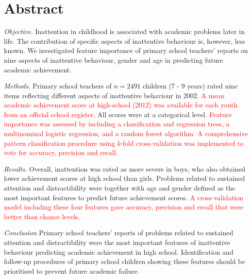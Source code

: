 \documentclass[10pt,letterpaper]{article}
\begin{document}
\section*{Abstract}
\noindent \emph{Objective.}
Inattention in childhood is associated with academic problems later in life. The contribution of specific aspects of inattentive behaviour is, however, less known. We investigated feature importance of primary school teachers' reports on nine aspects of inattentive behaviour, gender and age in predicting future academic achievement. 

\noindent \emph{Methods.} Primary school teachers of $n=2491$ children (7 - 9 years) rated nine items reflecting different aspects of inattentive behaviour in 2002. \textcolor{red}{A mean academic achievement score at high-school (2012) was available for each youth from an official school register.} All scores were at a categorical level. \textcolor{red}{Feature importance was assessed by including a classification and regression trees, a multinominal logistic regression, and a random forest algorithm. A comprehensive pattern classification procedure using {\em k}-fold cross-validation was implemented to vote for accuracy, precision and recall.}

\noindent \emph{Results.}
Overall, inattention was rated as more severe in boys, who also obtained lower achievement scores at high school than girls. Problems related to sustained attention and distractibility were together with age and gender defined as the most important features to predict future achievement scores. \textcolor{red}{A cross-validation model including these four features gave accuracy, precision and recall that were better than chance levels. }

\noindent \emph{Conclusion} 
Primary school teachers' reports of problems related to sustained attention and distractibility were the most important features of inattentive behaviour predicting academic achievement in high school.  Identification and follow-up procedures of primary school children showing these features should be prioritised to prevent future academic failure. %


\end{document}
